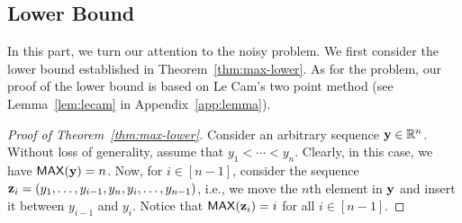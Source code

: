 \documentclass[journal, onecolumn]{IEEEtran}
\theoremstyle{plain}
\theoremstyle{definition}
\theoremstyle{remark}
\begin{document}
\subsection{Lower Bound} \label{sec:max-lower}
In this part, we turn our attention to the noisy \maxn problem. We first consider the lower bound established in Theorem~\ref{thm:max-lower}. As for the \orn problem, our proof of the lower bound is based on Le Cam's two point method (see Lemma~\ref{lem:lecam} in Appendix~\ref{app:lemma}).

\begin{proof}[Proof of Theorem~\ref{thm:max-lower}]
    Consider an arbitrary sequence ${\bf y} \in \mathbb{R}^n$. Without loss of generality, assume that $y_1 < \cdots < y_n$. Clearly, in this case, we have $\mathsf{MAX}({\bf y}) = n$. Now, for $i\in[n-1]$, consider the sequence ${\bf z}_i = (y_{1},\ldots, y_{i-1}, y_{n}, y_{i}, \ldots, y_{n-1})$, i.e., we move the $n$th element in ${\bf y}$ and insert it between $y_{i-1}$ and $y_i$. Notice that $\mathsf{MAX}({\bf z}_i)=i$ for all $i\in[n-1]$. 
    

\end{proof}
\end{document}
